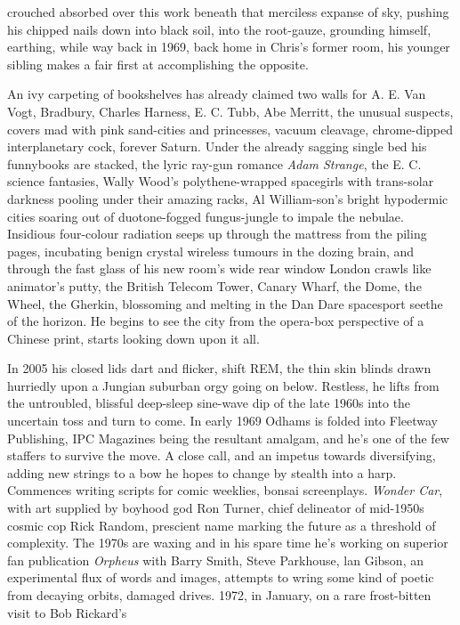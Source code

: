 \documentclass[
]{article}
\begin{document}
crouched absorbed over this work beneath that merciless expanse of sky,
pushing his chipped nails down into black soil, into the root-gauze,
grounding himself, earthing, while way back in 1969, back home in
Chris's former room, his younger sibling makes a fair first at
accomplishing the opposite. \par
An ivy carpeting of bookshelves has already claimed two walls for
A. E. Van Vogt, Bradbury, Charles Harness, E. C. Tubb, Abe Merritt, the
unusual suspects, covers mad with pink sand-cities and princesses,
vacuum cleavage, chrome-dipped interplanetary cock, forever Saturn.
Under the already sagging single bed his funnybooks are stacked, the
lyric ray-gun romance \emph{Adam Strange}, the E. C. science fantasies,
Wally Wood's polythene-wrapped spacegirls with trans-solar darkness
pooling under their amazing racks, Al William-son's bright hypodermic
cities soaring out of duotone-fogged fungus-jungle to impale the
nebulae. Insidious four-colour radiation seeps up through the mattress
from the piling pages, incubating benign crystal wireless tumours in the
dozing brain, and through the fast glass of his new room's wide rear
window London crawls like animator's putty, the British Telecom Tower,
Canary Wharf, the Dome, the Wheel, the Gherkin, blossoming and melting
in the Dan Dare spacesport seethe of the horizon. He begins to see the
city from the opera-box perspective of a Chinese print, starts looking
down upon it all. \par
In 2005 his closed lids dart and flicker, shift REM, the thin skin
blinds drawn hurriedly upon a Jungian suburban orgy going on below.
Restless, he lifts from the untroubled, blissful deep-sleep sine-wave
dip of the late 1960s into the uncertain toss and turn to come. In early
1969 Odhams is folded into Fleetway Publishing, IPC Magazines being the
resultant amalgam, and he's one of the few staffers to survive the move.
A close call, and an impetus towards diversifying, adding new strings to
a bow he hopes to change by stealth into a harp. Commences writing
scripts for comic weeklies, bonsai screenplays. \emph{Wonder Car}, with
art supplied by boyhood god Ron Turner, chief delineator of mid-1950s
cosmic cop Rick Random, prescient name marking the future as a threshold
of complexity. The 1970s are waxing and in his spare time he's working
on superior fan publication \emph{Orpheus} with Barry Smith, Steve
Parkhouse, lan Gibson, an experimental flux of words and images,
attempts to wring some kind of poetic from decaying orbits, damaged
drives. 1972, in January, on a rare frost-bitten visit to Bob Rickard's
\end{document}
